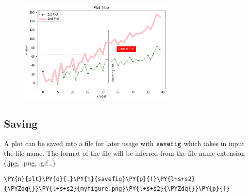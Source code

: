 \begin{figure}[h]
	\centering
	\includegraphics[width=0.7\textwidth]{figures/matplotlib_33_0.png}
\end{figure}

\subsection{Saving}\label{saving}

A plot can be saved into a file for later usage with \(\tt{savefig}\)
which takes in input the file name. The format of the file will be
inferred from the file name extension (.jpg, .png, .gif\ldots{})

\begin{tcolorbox}[breakable, size=fbox, boxrule=1pt, pad at break*=1mm,colback=cellbackground, colframe=cellborder]
\begin{Verbatim}[commandchars=\\\{\}]
\PY{n}{plt}\PY{o}{.}\PY{n}{savefig}\PY{p}{(}\PY{l+s+s2}{\PYZdq{}}\PY{l+s+s2}{myfigure.png}\PY{l+s+s2}{\PYZdq{}}\PY{p}{)}
\end{Verbatim}
\end{tcolorbox}

